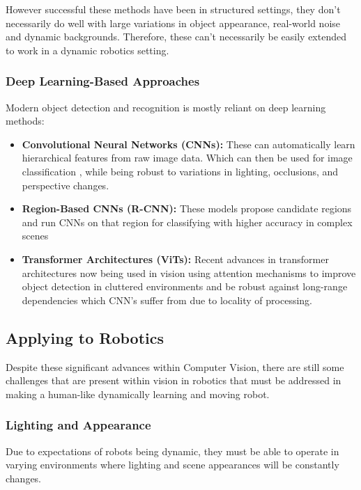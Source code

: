     However successful these methods have been in structured settings, they don't necessarily do well with large variations in object appearance, real-world noise and dynamic backgrounds. Therefore, these can't necessarily be easily extended to work in a dynamic robotics setting.

    \subsubsection{Deep Learning-Based Approaches}
    Modern object detection and recognition is mostly reliant on deep learning methods:
    \begin{itemize}
      \item \textbf{Convolutional Neural Networks (CNNs):} These \cite{gu2018recent,li2021survey} can automatically learn hierarchical features from raw image data. Which can then be used for image classification \cite{hijazi2015using,traore2018deep}, while being robust to variations in lighting, occlusions, and perspective changes.
      \item \textbf{Region-Based CNNs (R-CNN):} These models propose candidate regions and run CNNs on that region for classifying with higher accuracy in complex scenes \cite{bharati2020deep, girshick2015fastrcnn}
      \item \textbf{Transformer Architectures (ViTs):} Recent advances in transformer architectures \cite{bi2021transformer} now being used in vision using attention mechanisms to improve object detection in cluttered environments \cite{kayacan2024vision} and be robust against long-range dependencies which CNN's suffer from due to locality of processing.
    \end{itemize}

  \subsection{Applying to Robotics}
    Despite these significant advances within Computer Vision, there are still some challenges that are present within vision in robotics that must be addressed in making a human-like dynamically learning and moving robot.

    \subsubsection{Lighting and Appearance}
      Due to expectations of robots being dynamic, they must be able to operate in varying environments where lighting and scene appearances will be constantly changes.

